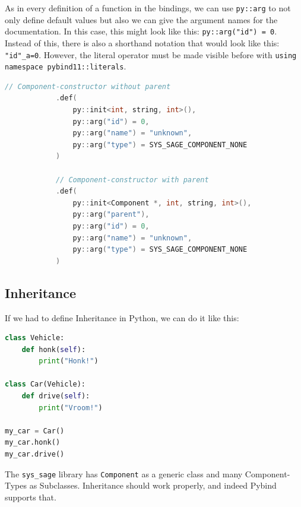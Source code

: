 As in every definition of a function in the bindings, we can use \verb|py::arg| to not only define default values but also we can give the argument names for the documentation. In this case, this might look like this: \verb|py::arg("id") = 0|. Instead of this, there is also a shorthand notation that would look like this: \verb|"id"_a=0|. However, the literal operator must be made visible before with \verb|using namespace pybind11::literals|.
\begin{lstlisting}[language=C++, xleftmargin=4em, frame = single]
            // Component-constructor without parent
            .def(
                py::init<int, string, int>(),
                py::arg("id") = 0,
                py::arg("name") = "unknown",
                py::arg("type") = SYS_SAGE_COMPONENT_NONE
            )
            
            // Component-constructor with parent
            .def(
                py::init<Component *, int, string, int>(),
                py::arg("parent"),
                py::arg("id") = 0,
                py::arg("name") = "unknown",
                py::arg("type") = SYS_SAGE_COMPONENT_NONE
            )
\end{lstlisting}
\subsection{Inheritance}

If we had to define Inheritance in Python, we can do it like this:
\newpage
\begin{lstlisting}[language=Python, xleftmargin=4em, frame = single]
class Vehicle:
    def honk(self):
        print("Honk!")

class Car(Vehicle):
    def drive(self):
        print("Vroom!")

my_car = Car()
my_car.honk()
my_car.drive()
\end{lstlisting}

The \verb|sys_sage| library has \verb|Component| as a generic class and many Component-Types as Subclasses. Inheritance should work properly, and indeed Pybind supports that.

